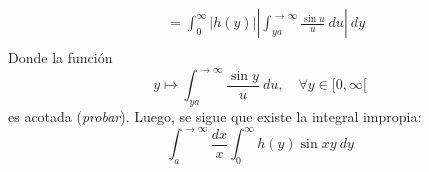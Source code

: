 \documentclass[12pt]{report}
\theoremstyle{largebreak}
\newcommand\abs[1]{\ensuremath{\left|#1\right|}}
\begin{document}
\begin{sol}
\begin{equation*}
\begin{split}
                &=\int_0^{\infty}\abs{h(y)}\abs{\int_{ya}^{ \rightarrow\infty}\frac{\sin u}{u}\:du}\:dy\\
            \end{split}
        \end{equation*}
        Donde la función
        \begin{equation*}
            y\mapsto\int_{ ya}^{\rightarrow\infty}\frac{\sin y}{u}\:du,\quad\forall y\in[0,\infty[
        \end{equation*}
        es acotada (\textit{probar}). Luego, se sigue que existe la integral impropia:
        \begin{equation*}
            \int_{a}^{ \rightarrow\infty}\frac{dx}{x}\int_0^{\infty}h(y)\sin xy\:dy
        \end{equation*}


\end{sol}
\end{document}
